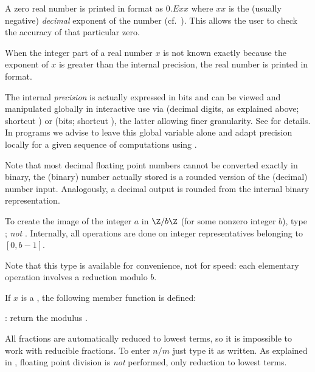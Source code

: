  A zero real number is printed in 
format as $0.Exx$ where $xx$ is the (usually negative) \emph{decimal}
exponent of the number (cf.~). This allows the user to
check the accuracy of that particular zero.

When the integer part of a real number $x$ is not known exactly because the
exponent of $x$ is greater than the internal precision, the real number is
printed in  format.

 The internal \emph{precision} is actually
expressed in bits and can be viewed and manipulated globally in interactive
use via  (decimal digits, as explained above; shortcut
) or  (bits; shortcut ), the
latter allowing finer granularity. See  for details. In
programs we advise to leave this global variable alone and adapt precision
locally for a given sequence of computations using .

Note that most decimal floating point numbers cannot be converted exactly
in binary, the (binary) number actually stored is a rounded version of the
(decimal) number input. Analogously, a decimal output is rounded
from the internal binary representation.

%
To create the image of the integer $a$ in $\Z/b\Z$ (for some nonzero
integer $b$), type ; \emph{not} .
Internally, all operations are done on integer representatives belonging to
$[0,b-1]$.

Note that this type is available for convenience, not for speed: each
elementary operation involves a reduction modulo $b$.

If $x$ is a  , the following member function is
defined:

: return the modulus .

%
All fractions are automatically reduced to lowest
terms, so it is impossible to work with reducible fractions. To enter $n/m$
just type it as written. As explained in , floating point
division is \emph{not} performed, only reduction to lowest
terms.\label{se:FRAC}

